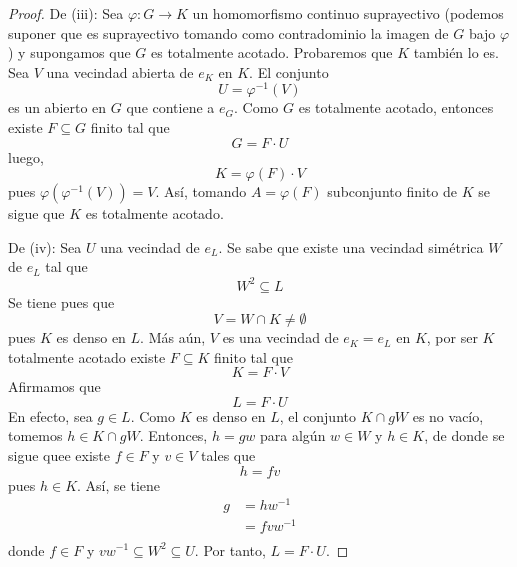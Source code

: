 \documentclass[12pt]{report}
\theoremstyle{largebreak}
\newcommand\cf[3]{\ensuremath{#1:#2\rightarrow#3}}
\begin{document}
\begin{proof}
        De (iii): Sea $\cf{\varphi}{G}{K}$ un homomorfismo continuo suprayectivo (podemos suponer que es suprayectivo tomando como contradominio la imagen de $G$ bajo $\varphi$) y supongamos que $G$ es totalmente acotado. Probaremos que $K$ también lo es. Sea $V$ una vecindad abierta de $e_K$ en $K$. El conjunto
        \begin{equation*}
            U=\varphi^{-1}(V)
        \end{equation*}
        es un abierto en $G$ que contiene a $e_G$. Como $G$ es totalmente acotado, entonces existe $F\subseteq G$ finito tal que
        \begin{equation*}
            G=F\cdot U
        \end{equation*}
        luego,
        \begin{equation*}
            K=\varphi(F)\cdot V
        \end{equation*}
        pues $\varphi(\varphi^{-1}(V))=V$. Así, tomando $A=\varphi(F)$ subconjunto finito de $K$ se sigue que $K$ es totalmente acotado.

        De (iv): Sea $U$ una vecindad de $e_L$. Se sabe que existe una vecindad simétrica $W$ de $e_L$ tal que
        \begin{equation*}
            W^2\subseteq L
        \end{equation*}
        Se tiene pues que
        \begin{equation*}
            V=W\cap K\neq\emptyset
        \end{equation*}
        pues $K$ es denso en $L$. Más aún, $V$ es una vecindad de $e_K=e_L$ en $K$, por ser $K$ totalmente acotado existe $F\subseteq K$ finito tal que
        \begin{equation*}
            K=F\cdot V
        \end{equation*}
        Afirmamos que
        \begin{equation*}
            L=F\cdot U
        \end{equation*}
        En efecto, sea $g\in L$. Como $K$ es denso en $L$, el conjunto $K\cap gW$ es no vacío, tomemos $h\in K\cap gW$. Entonces, $h=gw$ para algún $w\in W$ y $h\in K$, de donde se sigue quee existe $f\in F$ y $v\in V$ tales que
        \begin{equation*}
            h=fv
        \end{equation*}
        pues $h\in K$. Así, se tiene
        \begin{equation*}
            \begin{split}
                g&=hw^{-1}\\
                &=fvw^{-1}\\
            \end{split}
        \end{equation*}
        donde $f\in F$ y $vw^{-1}\subseteq W^2\subseteq U$. Por tanto, $L=F\cdot U$.
    \end{proof}
\end{document}

